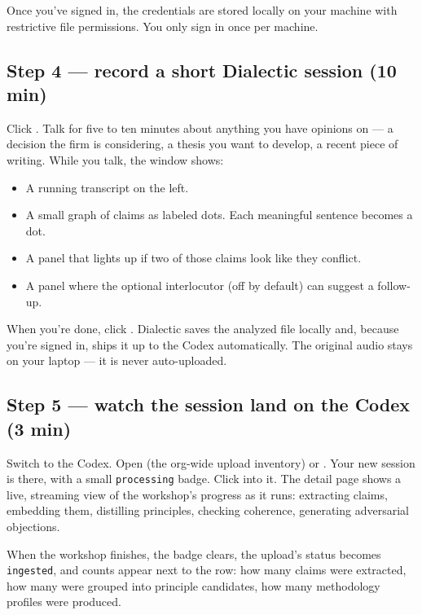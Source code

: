 \documentclass[11pt]{article}
\begin{document}
Once you've signed in, the credentials are stored locally on your
machine with restrictive file permissions. You only sign in once per
machine.

\subsection{Step 4 --- record a short Dialectic session (10 min)}

Click . Talk for five to ten minutes about anything
you have opinions on --- a decision the firm is considering, a thesis
you want to develop, a recent piece of writing. While you talk, the
window shows:

\begin{itemize}[leftmargin=*,itemsep=0.2em]
  \item A running transcript on the left.
  \item A small graph of claims as labeled dots. Each meaningful
        sentence becomes a dot.
  \item A  panel that lights up if two of those claims
        look like they conflict.
  \item A  panel where the optional interlocutor (off
        by default) can suggest a follow-up.
\end{itemize}

When you're done, click . Dialectic saves the
analyzed file locally and, because you're signed in, ships it up to
the Codex automatically. The original audio stays on your laptop ---
it is never auto-uploaded.


\subsection{Step 5 --- watch the session land on the Codex (3 min)}

Switch to the Codex. Open  (the org-wide upload
inventory) or . Your new session is there, with a small
\texttt{processing} badge. Click into it. The detail page shows a
live, streaming view of the workshop's progress as it runs: extracting
claims, embedding them, distilling principles, checking coherence,
generating adversarial objections.

When the workshop finishes, the badge clears, the upload's status
becomes \texttt{ingested}, and counts appear next to the row: how many
claims were extracted, how many were grouped into principle
candidates, how many methodology profiles were produced.
\end{document}
